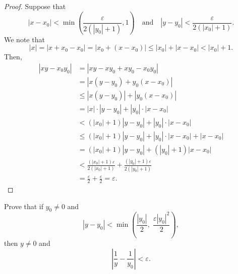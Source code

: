 \setcounter{equation}{0}
\begin{proof}
	Suppose that
	$$
		|x - x_0| < \min \left( \frac{\varepsilon}{2(|y_0| + 1)}, 1 \right) \quad \text {and} \quad |y - y_0| < \frac{\varepsilon}{2(|x_0| + 1)}.
	$$
	We note that
	$$
		|x| = |x + x_0 - x_0| = |x_0 + (x - x_0)| \leq |x_0| + |x - x_0| < |x_0| + 1.
	$$
	Then,
	\begin{align*}
		|x y - x_0 y_0| & = |x y - x y_0 + x y_0 - x_0 y_0|                                                            \\
		                & = |x(y - y_0) + y_0(x - x_0)|                                                                \\
		                & \leq |x(y - y_0)| + |y_0(x - x_0)|                                                           \\
		                & = |x| \cdot |y - y_0| + |y_0| \cdot |x - x_0|                                                \\
		                & < (|x_0| + 1)|y - y_0| + |y_0| \cdot |x - x_0|                                               \\
		                & \leq (|x_0| + 1)|y - y_0| + |y_0| \cdot |x - x_0| + |x - x_0|                                \\
		                & = (|x_0| + 1)|y - y_0| + (|y_0| + 1)|x - x_0|                                                \\
		                & < \frac{(|x_0| + 1)\varepsilon}{2(|x_0| + 1)} + \frac{(|y_0| + 1) \varepsilon}{2(|y_0| + 1)} \\
		                & = \frac{\varepsilon}{2} + \frac{\varepsilon}{2} = \varepsilon.
	\end{align*}
\end{proof}


\Newpage
\begin{problem} %
	\label{nprop:p:22}
	Prove that if $y_0 \neq 0$ and
	$$
		|y - y_0| < \min \left( \frac{|y_0|}{2}, \; \frac{\varepsilon |y_0|^{2}}{2} \right),
	$$
	then $y \neq 0$ and
	$$
		\left| \frac{1}{y} - \frac{1}{y_0} \right| < \varepsilon.
	$$
\end{problem}

